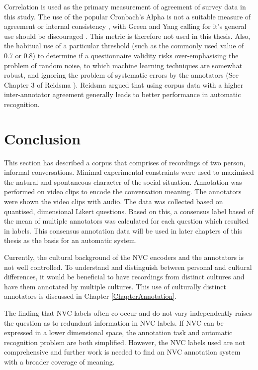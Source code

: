 Correlation is used as the primary measurement of agreement of survey data in this study. The use of the popular Cronbach's Alpha is not a suitable measure of agreement or internal consistency \cite{Sijtsma2009, Revelle2009, Sijtsma2009b}, with Green and Yang calling for it's general use should be discouraged \cite{Green2009}. This metric is therefore not used in this thesis. Also, the habitual use of a particular threshold (such as the commonly used value of 0.7 or 0.8) to determine if a questionnaire validity risks over-emphasising the problem of random noise, to which machine learning techniques are somewhat robust, and ignoring the problem of systematic errors by the annotators (See Chapter 3 of Reidsma \cite{Reidsma2008Thesis}). Reidsma argued that using corpus data with a higher inter-annotator agreement generally leads to better performance in automatic recognition.

\section{Conclusion}

This section has described a corpus that comprises of recordings of two person, informal conversations. Minimal experimental constraints were used to maximised the natural and spontaneous character of the social situation. Annotation was performed on video clips to encode the conversation meaning. The annotators were shown the video clips with audio. The data was collected based on quantised, dimensional Likert questions. Based on this, a consensus label based of the mean of multiple annotators was calculated for each question which resulted in \continuous labels. This consensus annotation data will be used in later chapters of this thesis as the basis for an automatic system.

Currently, the cultural background of the \ac{NVC} encoders and the annotators is not well controlled. To understand and distinguish between personal and cultural differences, it would be beneficial to have recordings from distinct cultures and have them annotated by multiple cultures. 
This use of culturally distinct annotators is discussed in Chapter \ref{ChapterAnnotation}.

The finding that \ac{NVC} labels often co-occur and do not vary independently raises the question as to redundant information in \ac{NVC} labels. If \ac{NVC} can be expressed in a lower dimensional space, the annotation task and automatic recognition problem are both simplified. However, the \ac{NVC} labels used are not comprehensive and further work is needed to find an \ac{NVC} annotation system with a broader coverage of meaning.

